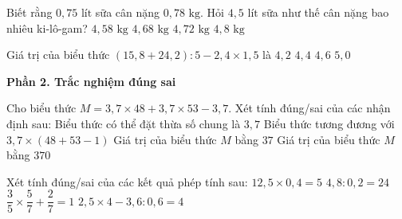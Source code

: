 \begin{ex} %
Biết rằng $0{,}75\text{ lít}$ sữa cân nặng $0{,}78\text{ kg}$. Hỏi $4{,}5\text{ lít}$ sữa như thế cân nặng bao nhiêu ki-lô-gam?
\choice
{$4{,}58\text{ kg}$}
{\True $4{,}68\text{ kg}$}
{$4{,}72\text{ kg}$}
{$4{,}8\text{ kg}$}
\end{ex}

\begin{ex} %
Giá trị của biểu thức $(15{,}8 + 24{,}2) : 5 - 2{,}4 \times 1{,}5$ là
\choice
{$4{,}2$}
{\True $4{,}4$}
{$4{,}6$}
{$5{,}0$}
\end{ex}

\textbf{Phần 2. Trắc nghiệm đúng sai}

\begin{ex} %
Cho biểu thức $M = 3{,}7 \times 48 + 3{,}7 \times 53 - 3{,}7$. Xét tính đúng/sai của các nhận định sau:
\choiceTF
{\True Biểu thức có thể đặt thừa số chung là $3{,}7$}
{\True Biểu thức tương đương với $3{,}7 \times (48 + 53 - 1)$}
{Giá trị của biểu thức $M$ bằng $37$}
{\True Giá trị của biểu thức $M$ bằng $370$}
\end{ex}

\begin{ex} %
Xét tính đúng/sai của các kết quả phép tính sau:
\choiceTF
{\True $12{,}5 \times 0{,}4 = 5$}
{\True $4{,}8 : 0{,}2 = 24$}
{$\dfrac{3}{5} \times \dfrac{5}{7} + \dfrac{2}{7} = 1$}
{\True $2{,}5 \times 4 - 3{,}6 : 0{,}6 = 4$}
\end{ex}

